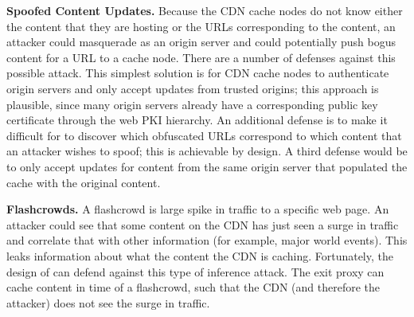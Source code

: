 {\bf Spoofed Content Updates.} Because the CDN cache
nodes do not know either the content that they are hosting or the URLs
corresponding to the content, an attacker could masquerade as an origin server
and could potentially push bogus content for a URL to a cache node. There are
a number of defenses against this possible attack. This simplest solution is
for CDN cache nodes to authenticate origin servers and only accept updates
from trusted origins; this approach is plausible, since many origin servers already
have a corresponding public key certificate through the web PKI hierarchy.  An additional
defense is to make it difficult for to discover which obfuscated URLs correspond
to which content that an attacker wishes to spoof; this is achievable by design.
A third defense would be to only accept updates for content from the same origin
server that populated the cache with the original content.

{\bf Flashcrowds.}  A flashcrowd is large spike in traffic to a specific web page.  An attacker 
could see that some content on the CDN has just seen a surge in traffic and correlate that with 
other information (for example, major world events).  This leaks information about what the content the 
CDN is caching.  Fortunately, the design of \system{} can defend against this type of inference attack.  
The exit proxy can cache content in time of a flashcrowd, such that the CDN (and therefore the attacker) 
does not see the surge in traffic.  

